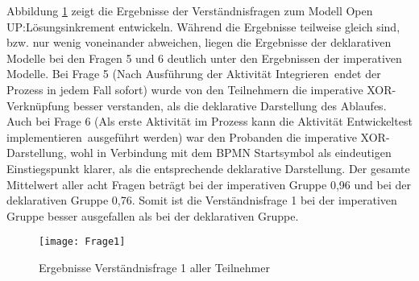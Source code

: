Abbildung \ref{fig:Frage1} zeigt die Ergebnisse der Verständnisfragen zum Modell \grqq Open UP:Lösungsinkrement entwickeln\grqq. Während die Ergebnisse teilweise gleich sind, bzw. nur wenig voneinander abweichen, liegen die Ergebnisse der deklarativen Modelle bei den Fragen 5 und 6 deutlich unter den Ergebnissen der imperativen Modelle. \newline
Bei Frage 5 (\grqq Nach Ausführung der Aktivität \grqq Integrieren\grqq \ endet der Prozess in jedem Fall sofort\grqq) wurde von den Teilnehmern die imperative XOR- Verknüpfung besser verstanden, als die deklarative Darstellung des Ablaufes. Auch bei Frage 6 (\grqq Als erste Aktivität im Prozess kann die Aktivität \grqq Entwickeltest implementieren\grqq \ ausgeführt werden\grqq) war den Probanden die imperative XOR-Darstellung, wohl in Verbindung mit dem BPMN Startsymbol als eindeutigen Einstiegspunkt klarer, als die entsprechende deklarative Darstellung.\newline
Der gesamte Mittelwert aller acht Fragen beträgt bei der imperativen Gruppe 0,96 und bei der deklarativen Gruppe 0,76. Somit ist die Verständnisfrage 1 bei der imperativen Gruppe besser ausgefallen als bei der deklarativen Gruppe. \newline

\begin{figure}[htp]
\begin{center}
  \texttt{[image: Frage1]} %
  \caption{Ergebnisse Verständnisfrage 1 aller Teilnehmer}
  \label{fig:Frage1}
\end{center}
\end{figure}


